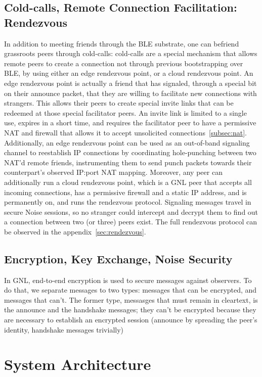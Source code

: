 \subsection{Cold-calls, Remote Connection Facilitation: Rendezvous}
\label{subsec:rendezvous}
In addition to meeting friends through the BLE substrate, one can befriend grassroots peers through cold-calls: cold-calls are a special mechanism that allows remote peers to create a connection not through previous bootstrapping over BLE, by using either an edge rendezvous point, or a cloud rendezvous point.
An edge rendezvous point is actually a friend that has signaled, through a special bit on their announce packet, that they are willing to facilitate new connections with strangers. This allows their peers to create special invite links that can be redeemed at those special facilitator peers. An invite link is limited to a single use, expires in a short time, and requires the facilitator peer to have a permissive NAT and firewall that allows it to accept unsolicited connections~\ref{subsec:nat}.
Additionally, an edge rendezvous point can be used as an out-of-band signaling channel to reestablish IP connections by coordinating hole-punching between two NAT'd remote friends, instrumenting them to send punch packets towards their counterpart's observed IP:port NAT mapping.
Moreover, any peer can additionally run a cloud rendezvous point, which is a GNL peer that accepts all incoming connections, has a permissive firewall and a static IP address, and is permanently on, and runs the rendezvous protocol.
Signaling messages travel in secure Noise sessions, so no stranger could intercept and decrypt them to find out a connection between two (or three) peers exist.
The full rendezvous protocol can be observed in the appendix~\ref{sec:rendezvous}.

\subsection{Encryption, Key Exchange, Noise Security}
\label{subsec:encryption}
In GNL, end-to-end encryption is used to secure messages against observers. To do that, we separate messages to two types: messages that can be encrypted, and messages that can't. The former type, messasges that must remain in cleartext, is the announce and the handshake messages; they can't be encrypted because they are necessary to establish an encrypted session (announce by spreading the peer's identity, handshake messages trivially)
\section{System Architecture}

